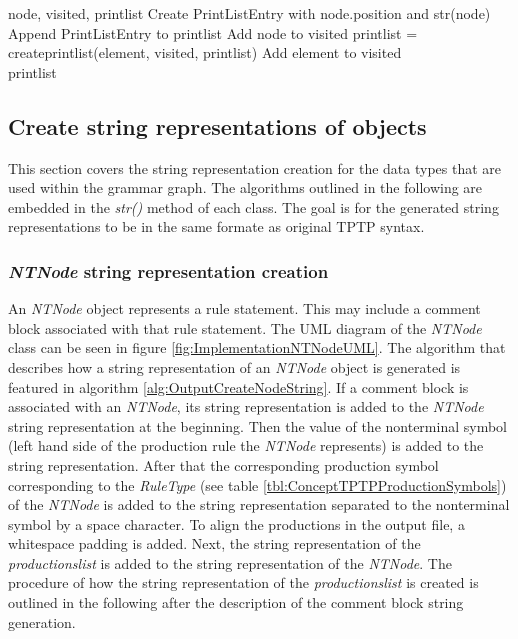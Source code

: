 \begin{algorithm}[H]
\caption{Output Algorithm: create\textunderscore print\textunderscore list}\label{alg:OutputCreatePrintList}
\begin{algorithmic}[1] 
\Require node, visited, print\textunderscore list
\State Create PrintListEntry with node.position and str(node)
\State Append PrintListEntry to print\textunderscore list
\State Add node to visited
			\State print\textunderscore list = create\textunderscore print\textunderscore list(element, visited, print\textunderscore list)
			\State Add element to visited
		\EndIf
	\EndFor
\EndFor \\
\Return print\textunderscore list
\end{algorithmic}
\end{algorithm}

\subsection{Create string representations of objects}\label{sec:ImplementationOutputGrammarGraphStringRepresentations}

This section covers the string representation creation for the data types that are used within the grammar graph.
The algorithms outlined in the following are embedded in the \textit{\textunderscore \textunderscore str\textunderscore \textunderscore ()} method of each class.
The goal is for the generated string representations to be in the same formate as original \ac{TPTP} syntax.

\subsubsection{\textit{NTNode} string representation creation}

An \textit{NTNode} object represents a rule statement. This may include a comment block associated with that rule statement.
The UML diagram of the \textit{NTNode} class can be seen in figure \ref{fig:ImplementationNTNodeUML}.
The algorithm that describes how a string representation of an \textit{NTNode} object is generated is featured in algorithm \ref{alg:OutputCreateNodeString}.
If a comment block is associated with an \textit{NTNode}, its string representation is added to the \textit{NTNode} string representation at the beginning.
Then the value of the nonterminal symbol (left hand side of the production rule the \textit{NTNode} represents) is added to the string representation.
After that the corresponding production symbol corresponding to the \textit{RuleType} (see table \ref{tbl:ConceptTPTPProductionSymbols}) of the \textit{NTNode} is added to the string representation separated to the nonterminal symbol by a space character.
To align the productions in the output file, a whitespace padding is added.
Next, the string representation of the \textit{productions\textunderscore list} is added to the string representation of the \textit{NTNode}.
The procedure of how the string representation of the \textit{productions\textunderscore list} is created is outlined in the following after the description of the comment block string generation.

